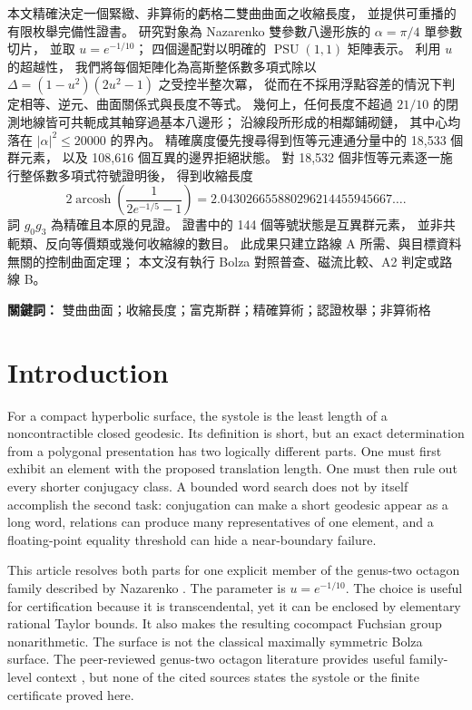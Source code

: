 \documentclass[11pt,a4paper]{article}
\theoremstyle{definition}
\newcommand{\PSU}{\operatorname{PSU}}
\begin{document}
{\cjkfont
\par{}\medskip
\raggedright
本文精確決定一個緊緻、非算術的虧格二雙曲曲面之收縮長度，\allowbreak
並提供可重播的有限枚舉完備性證書。\allowbreak
研究對象為 Nazarenko 雙參數八邊形族的 \(\alpha=\pi/4\) 單參數切片，\allowbreak
並取 \(u=e^{-1/10}\)；\allowbreak
四個邊配對以明確的 \(\PSU(1,1)\) 矩陣表示。\allowbreak
利用 \(u\) 的超越性，\allowbreak
我們將每個矩陣化為高斯整係數多項式除以
\(\Delta=(1-u^2)(2u^2-1)\) 之受控半整次冪，\allowbreak
從而在不採用浮點容差的情況下判定相等、逆元、曲面關係式與長度不等式。\allowbreak
幾何上，任何長度不超過 \(21/10\) 的閉測地線皆可共軛成其軸穿過基本八邊形；\allowbreak
沿線段所形成的相鄰鋪砌鏈，\allowbreak
其中心均落在 \(\lvert\alpha\rvert^2\leq20000\) 的界內。\allowbreak
精確廣度優先搜尋得到恆等元連通分量中的 18,533 個群元素，\allowbreak
以及 108,616 個互異的邊界拒絕狀態。\allowbreak
對 18,532 個非恆等元素逐一施行整係數多項式符號證明後，\allowbreak
得到收縮長度
\[
2\operatorname{arcosh}\!\left(\frac{1}{2e^{-1/5}-1}\right)
=2.043026655880296214455945667\ldots .
\]
詞 \(g_0g_3\) 為精確且本原的見證。\allowbreak
證書中的 144 個等號狀態是互異群元素，\allowbreak
並非共軛類、反向等價類或幾何收縮線的數目。\allowbreak
此成果只建立路線 A 所需、與目標資料無關的控制曲面定理；\allowbreak
本文沒有執行 Bolza 對照普查、磁流比較、A2 判定或路線 B。

\noindent\textbf{關鍵詞：} 雙曲曲面；收縮長度；富克斯群；精確算術；認證枚舉；非算術格
}

\section{Introduction}

For a compact hyperbolic surface, the systole is the least length of a
noncontractible closed geodesic.  Its definition is short, but an exact
determination from a polygonal presentation has two logically different
parts.  One must first exhibit an element with the proposed translation
length.  One must then rule out every shorter conjugacy class.  A bounded
word search does not by itself accomplish the second task: conjugation can
make a short geodesic appear as a long word, relations can produce many
representatives of one element, and a floating-point equality threshold can
hide a near-boundary failure.

This article resolves both parts for one explicit member of the genus-two
octagon family described by Nazarenko 
\cite[eqs.~(10)--(18)]{Nazarenko2013}.  The parameter is
\(u=e^{-1/10}\).  The choice is useful for certification because it is
transcendental, yet it can be enclosed by elementary rational Taylor bounds.
It also makes the resulting cocompact Fuchsian group nonarithmetic.  The
surface is not the classical maximally symmetric Bolza surface.  The
peer-reviewed genus-two octagon literature provides useful family-level
context \cite[abstract]{AigonDupuyEtAl2005}, but none of the cited sources states
the systole or the finite certificate proved here.
\end{document}
